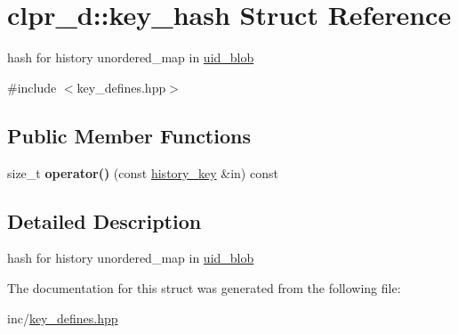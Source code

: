 \hypertarget{structclpr__d_1_1key__hash}{\section{clpr\-\_\-d\-:\-:key\-\_\-hash \-Struct \-Reference}
\label{structclpr__d_1_1key__hash}
}


hash for history unordered\-\_\-map in \hyperlink{classclpr__d_1_1uid__blob}{uid\-\_\-blob}  




{\ttfamily \#include $<$key\-\_\-defines.\-hpp$>$}

\subsection*{\-Public \-Member \-Functions}
\begin{DoxyCompactItemize}
\item 
\hypertarget{structclpr__d_1_1key__hash_aadd0189b1a2800f42a3e2575219afe9d}{size\-\_\-t {\bfseries operator()} (const \hyperlink{structclpr__d_1_1history__key}{history\-\_\-key} \&in) const }\label{structclpr__d_1_1key__hash_aadd0189b1a2800f42a3e2575219afe9d}

\end{DoxyCompactItemize}


\subsection{\-Detailed \-Description}
hash for history unordered\-\_\-map in \hyperlink{classclpr__d_1_1uid__blob}{uid\-\_\-blob} 

\-The documentation for this struct was generated from the following file\-:\begin{DoxyCompactItemize}
\item 
inc/\hyperlink{key__defines_8hpp}{key\-\_\-defines.\-hpp}\end{DoxyCompactItemize}
